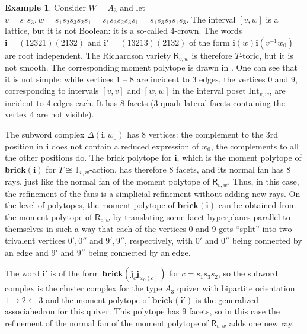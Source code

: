 \documentclass[a4paper, 11pt]{amsart}
\newcommand{\brick}{\mathbf{brick}}
\newcommand{\rich}[1]{\mathsf{R}_{#1}}
\newcommand{\word}[1]{\mathbf{#1}}
\newcommand{\dil}[1]{\mathbb{T}_{#1}}
\theoremstyle{definition}
\newtheorem{example}[theorem]{Example}
\begin{document}
\begin{example}
\label{ex:4-crown}
Consider $W = A_3$ and let $v = s_1s_3, w = s_1s_2s_3s_2s_1 = s_1s_3s_2s_3s_1 = s_1s_3s_2s_1s_3$. The interval $[v,w]$ is a lattice, but it is not Boolean: it is a so-called 4-crown. The words $\word{i} = (12321)(2132)$ and $\word{i'} = (13213)(2132)$ of the form 
$\word{i}(w)\word{i}(v^{-1}w_0)$ are root independent. The Richardson variety $\rich{v,w}$ is therefore $T$-toric, but it is not smooth. The corresponding moment polytope is drawn in \cite[Figure 3]{GKSB}. One can see that it is not simple: while vertices 1 -- 8 are incident to 3 edges, the vertices 0 and 9, corresponding to intervals $[v,v]$ and $[w,w]$ in the interval poset $\mathrm{Int}_{v,w}$, are incident to 4 edges each. It has 8 facets (3 quadrilateral facets containing the vertex 4 are not visible). 

The subword complex $\Delta(\word{i}, w_0)$ has 8 vertices: the complement to the 3rd position in $\word{i}$ does not contain a reduced expression of $w_0$, the complements to all the other positions do. The brick polytope for $\word{i}$, which is the moment polytope of $\brick(\word{i})$ for $T \cong \dil{v,w}$-action, has therefore 8 facets, and its normal fan has 8 rays, just like the normal fan of the moment polytope of $\rich{v,w}$. Thus, in this case, the refinement of the fans is a simplicial refinement without adding new rays. On the level of polytopes, the moment polytope of $\brick(\word{i})$ can be obtained from the moment polytope of 
$\rich{v,w}$ by translating some facet hyperplanes parallel to themselves in such a way that each of the vertices 0 and 9 gets ``split'' into two trivalent vertices $0', 0''$ and $9', 9''$, respectively, with $0'$ and $0''$ being connected by an edge and $9'$ and $9''$ being connected by an edge. 

The word $\word{i'}$ is of the form $\brick(\word{j}_c \word{j}_{w_0(c)})$ for $c = s_1 s_3 s_2$, so the subword complex is the cluster complex for the type $A_3$ quiver with bipartite orientation $1 \to 2 \leftarrow 3$ and the moment polytope of $\brick(\word{i'})$ is the generalized associahedron for this quiver. This polytope has 9 facets, so in this case the refinement of the normal fan of the moment polytope of $\rich{v,w}$ adds one new ray. 
\end{example}
\end{document}
